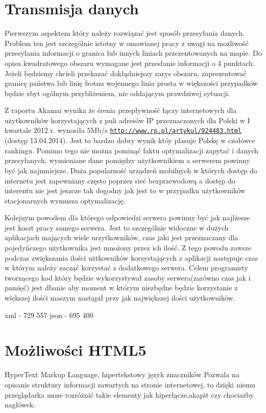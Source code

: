 \section{Transmisja danych}
\label{sec:transmisjaDanych}

Pierwszym aspektem który należy rozwiązać jest sposób przesyłania danych. Problem ten jest szczególnie istotny w omawianej pracy z uwagi na możliwość przesyłania informacji o granica lub innych liniach przezentowanych na mapie. Do opisu kwadratowego obszaru wymagane jest przesłanie informacji o 4 punktach. Jeżeli będziemy chcieli przekazać dokłądniejszy zarys obszaru, zaprezentować granicę państwa lub linię frotnu wojennego linia prosta w większości przypadków będzie zbyt ogólnym przybliżeniem, nie oddającym prawdziwej sytuacji.

Z raportu Akamai wynika że śrenia przepływność łączy internetowych dla użytkowników korzystających z puli adresów IP przeznaczonych dla Polski w I kwartale 2012 r. wynosiła 5Mb/s  \underline{\texttt{http://www.rp.pl/artykul/924483.html}} (dostęp 13.04.2014). Jest to bardzo dobry wynik któy plasuje Polskę w czołówce rankingu. Pomimo tego nie można pominąć faktu optymalizacji zapytać i danych przesyłanych, wymieniane dane pomiędzy użytkownikiem a serwerem powinny być jak najmniejsze. Duża popularność urządzeń mobilnych w których dostęp do internetu jest zapewniany często poprzez sieć bezprzewodową a dostęp do interentu nie jest jeszcze tak dogodny jak jest to w przypadku użytkowników stacjonarnych  wymusza optymalizację.

Kolejnym powodem dla którego odpowiedzi serwera powinny być jak najlżesze jest koszt pracy samego serwera. Jest to szczególnie widoczne w dużych aplikacjach mających wiele urzytkowników, czas jaki jest przeznaczany dla pojedyńczego użytkownika jest mnożony przez ich ilość. Z tego powodu zawsze podczas zwiększania ilości użtkowników korzystających z aplikacji następuje czas w którym należy zacząć korzystać z dodatkowego serwera. Celem programisty tworzącego kod który będzie wykorzystywał zasoby serwera(zarówno czas jak i pamięć) jest dbanie aby moment w którym niezbędne będzie korzystanie z większej ilośći maszym nastąpił przy jak największej ilości użytkowników.

xml - 729  557
json - 695  400


\section{Możliwości HTML5}
\label{sec:html5}
\nocite{xml50}
\nocite{proxml}
\nocite{pre1}
\nocite{pre2}
\nocite{googlemapsbegin}
\nocite{proHTML5}
HyperText Markup Language,  hipertekstowy język znaczników
Pozwala na opisanie struktury informacji zawartych na stronie internetowej, to dzięki niemu przeglądarka moze rozróżnić takie elementy jak hiperłącze,akapit czy chociażby nagłówek.

